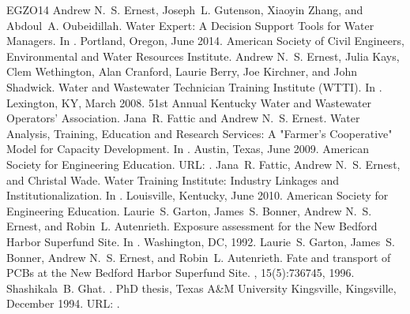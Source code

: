 \documentclass[letterpaper,12pt,english,openany,oneside]{sphinxmanual}
\begin{document}
\begin{sphinxthebibliography}{EGZO14}
\sphinxAtStartPar
Andrew N. S. Ernest, Joseph L. Gutenson, Xiaoyin Zhang, and Abdoul A. Oubeidillah. Water Expert: A Decision Support Tools for Water Managers. In . Portland, Oregon, June 2014. American Society of Civil Engineers, Environmental and Water Resources Institute.
\sphinxAtStartPar
Andrew N. S. Ernest, Julia Kays, Clem Wethington, Alan Cranford, Laurie Berry, Joe Kirchner, and John Shadwick. Water and Wastewater Technician Training Institute (WTTI). In . Lexington, KY, March 2008. 51st Annual Kentucky Water and Wastewater Operators’ Association.
\sphinxAtStartPar
Jana R. Fattic and Andrew N. S. Ernest. Water Analysis, Training, Education and Research Services: A "Farmer’s Cooperative" Model for Capacity Development. In . Austin, Texas, June 2009. American Society for Engineering Education. URL: .
\sphinxAtStartPar
Jana R. Fattic, Andrew N. S. Ernest, and Christal Wade. Water Training Institute: Industry Linkages and Institutionalization. In . Louisville, Kentucky, June 2010. American Society for Engineering Education.
\sphinxAtStartPar
Laurie S. Garton, James S. Bonner, Andrew N. S. Ernest, and Robin L. Autenrieth. Exposure assessment for the New Bedford Harbor Superfund Site. In . Washington, DC, 1992.
\sphinxAtStartPar
Laurie S. Garton, James S. Bonner, Andrew N. S. Ernest, and Robin L. Autenrieth. Fate and transport of PCBs at the New Bedford Harbor Superfund Site. , 15(5):736\textendash{}745, 1996.
\sphinxAtStartPar
Shashikala B. Ghat. . PhD thesis, Texas A\&M University \sphinxhyphen{} Kingsville, Kingsville, December 1994. URL: .
\end{sphinxthebibliography}



\renewcommand{\indexname}{Index}
\printindex
\end{document}
